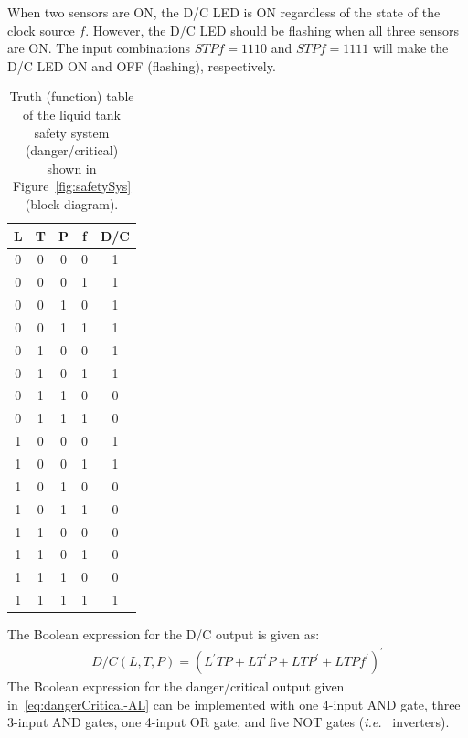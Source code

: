 When two sensors are ON, the D/C LED is ON regardless of the state of the clock source $f.$ However, the D/C LED should be flashing when all three sensors are ON. The input combinations $STPf = 1110$ and $STPf = 1111$ will make the D/C LED ON and OFF (flashing), respectively. %
%
\begin{table}  
  \centering
  \caption{Truth (function) table  of the liquid tank safety system (danger/critical) shown in Figure~\ref{fig:safetySys} (block diagram).}  
  \begin{tabular}{cccc|c}
    \toprule
    L & T & P & f & D/C\\
    \toprule
    0 & 0 & 0 & 0 & 1\\
    0 & 0 & 0 & 1 & 1\\
    0 & 0 & 1 & 0 & 1\\
    0 & 0 & 1 & 1 & 1\\
    0 & 1 & 0 & 0 & 1\\
    0 & 1 & 0 & 1 & 1\\
    0 & 1 & 1 & 0 & 0\\
    0 & 1 & 1 & 1 & 0\\
    1 & 0 & 0 & 0 & 1\\
    1 & 0 & 0 & 1 & 1\\
    1 & 0 & 1 & 0 & 0\\
    1 & 0 & 1 & 1 & 0\\
    1 & 1 & 0 & 0 & 0\\
    1 & 1 & 0 & 1 & 0\\
    1 & 1 & 1 & 0 & 0\\
    1 & 1 & 1 & 1 & 1\\    
    \bottomrule
  \end{tabular}
  \label{tab:truthTableTank3}
\end{table}
%
The Boolean expression for the D/C output is given as: %
%
\begin{align}
  D/C(L,T,P) = (L^{'}TP + LT^{'}P + LTP^{'} + LTPf^{'})^{'}
  \label{eq:dangerCritical-AL}
\end{align}
%
The Boolean expression for the danger/critical output given in~\eqref{eq:dangerCritical-AL} can be implemented with one 4-input AND gate, three 3-input AND gates, one 4-input OR gate, and five NOT gates (\textit{i.e.~} inverters).  

